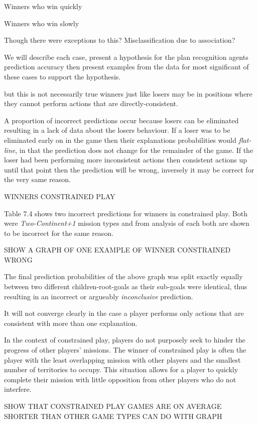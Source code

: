 \documentclass[parskip]{cs4rep}
\begin{document}
Winners who win quickly

Winners who win slowly

Though there were exceptions to this? Misclassification due to association?

We will describe each case, present a hypothesis for the plan recognition agents prediction accuracy then present examples from the data for most significant of these cases to support the hypothesis. 

but this is not necessarily true winners just like losers may be in positions where they cannot perform actions that are directly-consistent.

A proportion of incorrect predictions occur because losers can be eliminated resulting in a lack of data about the losers behaviour. If a loser was to be eliminated early on in the game then their explanations probabilities would \textit{flat-line}, in that the prediction does not change for the remainder of the game. If the loser had been performing more inconsistent actions then consistent actions up until that point then the prediction will be wrong, inversely it may be correct for the very same reason.

WINNERS CONSTRAINED PLAY

Table 7.4 shows two incorrect predictions for winners in constrained play. Both were \textit{Two-Continent+1} mission types and from analysis of each both are shown to be incorrect for the same reason. 

SHOW A GRAPH OF ONE EXAMPLE OF WINNER CONSTRAINED WRONG

The final prediction probabilities of the above graph was split exactly equally between two different children-root-goals as their sub-goals were identical, thus resulting in an incorrect or argueably \textit{inconclusive} prediction.

It will not converge clearly in the case a player performs only actions that are consistent with more than one explanation.
 
In the context of constrained play, players do not purposely seek to hinder the progress of other players' missions. The winner of constrained play is often the player with the least overlapping mission with other players and the smallest number of territories to occupy. This situation allows for a player to quickly complete their mission with little opposition from other players who do not interfere.

SHOW THAT CONSTRAINED PLAY GAMES ARE ON AVERAGE SHORTER THAN OTHER GAME TYPES CAN DO WITH GRAPH
\end{document}
